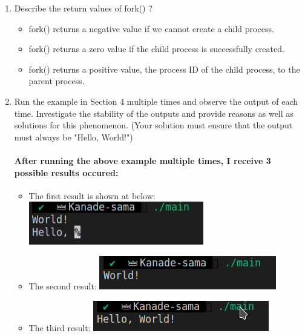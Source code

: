 \documentclass[a4paper]{article}
\begin{document}
\begin{enumerate}
    \item Describe the return values of fork() ?
    \begin{itemize}
        \item fork() returns a negative value if we cannot create a child process.
        \item fork() returns a zero value if the child process is successfully created.
        \item fork() returns a positive value, the process ID of the child process, to the parent process.
    \end{itemize}

    \item Run the example in Section 4 multiple times and observe the output of each time. Investigate the stability of the outputs and provide reasons as well as solutions for this phenomenon. (Your solution must ensure that the output must always be "Hello, World!") \\
    \paragraph{After running the above example multiple times, I receive 3 possible results occured:}
    \begin{itemize}
        \item The first result is shown at below:
        \bigbreak
        \includegraphics[scale = 0.5]{First_Result.png}
        \bigbreak

        \item The second result:
        \bigbreak
        \includegraphics[scale = 0.5]{Second_Result.png}
        \bigbreak

        \item The third result:
        \bigbreak
        \includegraphics[scale = 0.5]{Third_Result.png}
        \bigbreak
    \end{itemize}


\end{enumerate}
\end{document}
